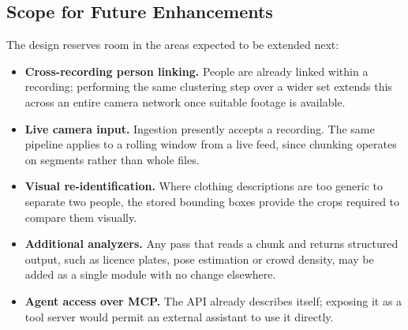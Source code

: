 \subsection{Scope for Future Enhancements}

The design reserves room in the areas expected to be extended next:

\begin{itemize}
  \item \textbf{Cross-recording person linking.} People are already linked within a
        recording; performing the same clustering step over a wider set extends this
        across an entire camera network once suitable footage is available.
  \item \textbf{Live camera input.} Ingestion presently accepts a recording. The same
        pipeline applies to a rolling window from a live feed, since chunking operates
        on segments rather than whole files.
  \item \textbf{Visual re-identification.} Where clothing descriptions are too generic
        to separate two people, the stored bounding boxes provide the crops required
        to compare them visually.
  \item \textbf{Additional analyzers.} Any pass that reads a chunk and returns
        structured output, such as licence plates, pose estimation or crowd density,
        may be added as a single module with no change elsewhere.
  \item \textbf{Agent access over MCP.} The API already describes itself; exposing it
        as a tool server would permit an external assistant to use it directly.
\end{itemize}
